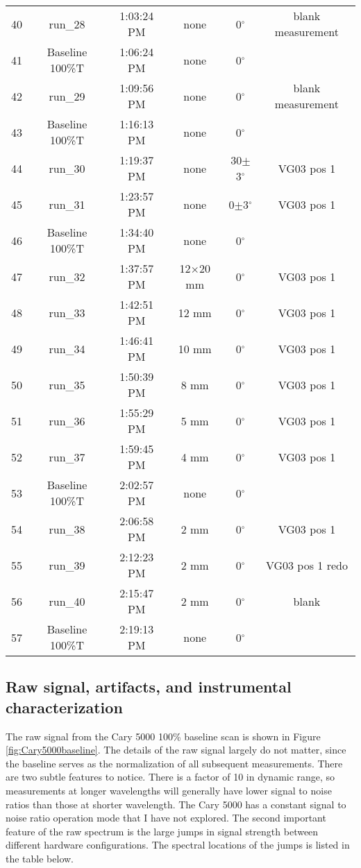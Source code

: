\begin{center}
\begin{longtable}{c c c c c  c}
      40 & run\_28 &    1:03:24 PM & none & 0$^{\circ}$& blank measurement\\
      41 & Baseline 100\%T &    1:06:24 PM & none & 0$^{\circ}$&\\
      42 & run\_29 &    1:09:56 PM & none & 0$^{\circ}$& blank measurement\\
      43 & Baseline 100\%T &    1:16:13 PM & none & 0$^{\circ}$& \\
      44 & run\_30 &    1:19:37 PM & none & 30$\pm$3$^{\circ}$& VG03 pos 1\\
      45 & run\_31 &    1:23:57 PM & none & 0$\pm$3$^{\circ}$& VG03 pos 1\\
      46 & Baseline 100\%T &    1:34:40 PM & none & 0$^{\circ}$& \\
      47 & run\_32 &    1:37:57 PM & 12$\times$20 mm & 0$^{\circ}$& VG03 pos 1\\
      48 & run\_33 &    1:42:51 PM & 12 mm & 0$^{\circ}$& VG03 pos 1\\
      49 & run\_34 &    1:46:41 PM & 10 mm & 0$^{\circ}$& VG03 pos 1\\
      50 & run\_35 &    1:50:39 PM & 8 mm & 0$^{\circ}$& VG03 pos 1\\
      51 & run\_36 &    1:55:29 PM & 5 mm & 0$^{\circ}$& VG03 pos 1\\
      52 & run\_37 &    1:59:45 PM & 4 mm & 0$^{\circ}$& VG03 pos 1\\
      53 & Baseline 100\%T &    2:02:57 PM & none & 0$^{\circ}$& \\
      54 & run\_38 &    2:06:58 PM & 2 mm & 0$^{\circ}$& VG03 pos 1\\
      55 & run\_39 &    2:12:23 PM & 2 mm & 0$^{\circ}$& VG03 pos 1 redo\\
      56 & run\_40 &    2:15:47 PM & 2 mm & 0$^{\circ}$& blank\\
      57 & Baseline 100\%T &    2:19:13 PM & none & 0$^{\circ}$& \\
    \hline
    \end{longtable}%
\end{center}

\subsection{Raw signal, artifacts, and instrumental characterization}
The raw signal from the Cary 5000 100\% baseline scan  is shown in Figure \ref{fig:Cary5000baseline}.  The details of the raw signal largely do not matter, since the baseline serves as the normalization of all subsequent measurements.  There are two subtle features to notice.  There is a factor of 10 in dynamic range, so measurements at longer wavelengths will generally have lower signal to noise ratios than those at shorter wavelength.  The Cary 5000 has a constant signal to noise ratio operation mode that I have not explored.  The second important feature of the raw spectrum is the large jumps in signal strength between different hardware configurations.  The spectral locations of the jumps is listed in the table below.  

